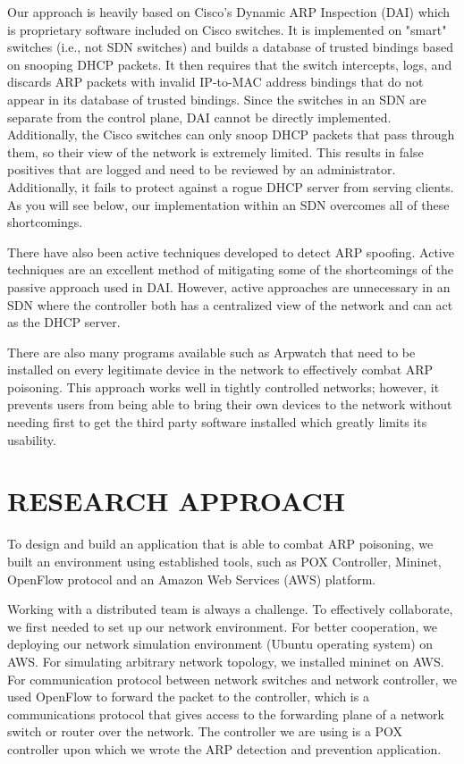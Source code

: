 \documentclass[conference]{IEEEtran}
\begin{document}
Our approach is heavily based on Cisco's Dynamic ARP Inspection (DAI)\cite{b12} which is proprietary software included on Cisco switches. It is implemented on "smart" switches (i.e., not SDN switches) and builds a database of trusted bindings based on snooping DHCP packets. It then requires that the switch intercepts, logs, and discards ARP packets with invalid IP-to-MAC address bindings that do not appear in its database of trusted bindings. Since the switches in an SDN are separate from the control plane, DAI cannot be directly implemented. Additionally, the Cisco switches can only snoop DHCP packets that pass through them, so their view of the network is extremely limited. This results in false positives that are logged and need to be reviewed by an administrator. Additionally, it fails to protect against a rogue DHCP server from serving clients. As you will see below, our implementation within an SDN overcomes all of these shortcomings.

There have also been active techniques developed to detect ARP spoofing\cite{b13}. Active techniques are an excellent method of mitigating some of the shortcomings of the passive approach used in DAI. However, active approaches are unnecessary in an SDN where the controller both has a centralized view of the network and can act as the DHCP server.

There are also many programs available such as Arpwatch that need to be installed on every legitimate device in the network to effectively combat ARP poisoning. This approach works well in tightly controlled networks; however, it prevents users from being able to bring their own devices to the network without needing first to get the third party software installed which greatly limits its usability.

\section{RESEARCH APPROACH}
To design and build an application that is able to combat ARP poisoning, we built an environment using established tools, such as POX Controller, Mininet, OpenFlow protocol and an Amazon Web Services (AWS) platform.

Working with a distributed team is always a challenge. To effectively collaborate, we first needed to set up our network environment. For better cooperation, we deploying our network simulation environment (Ubuntu operating system) on AWS. For simulating arbitrary network topology, we installed mininet on AWS. For communication protocol between network switches and network controller, we used OpenFlow to forward the packet to the controller, which is a communications protocol that gives access to the forwarding plane of a network switch or router over the network. The controller we are using is a POX controller upon which we wrote the ARP detection and prevention application.
\end{document}
